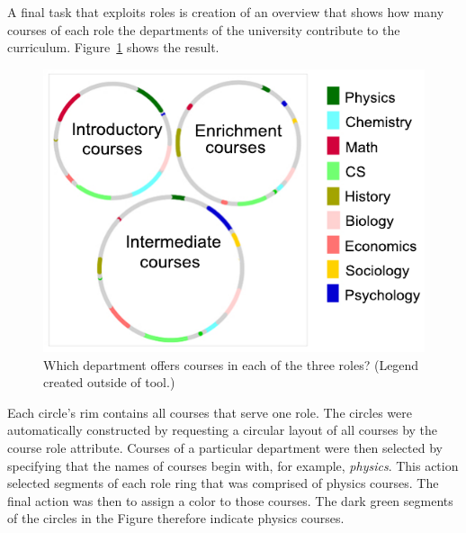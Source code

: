A final task that exploits roles is creation of an overview that shows
how many courses of each role the departments of the university
contribute to the curriculum. Figure~\ref{fig:rolxCircles} shows the
result.
\begin{figure}
    \centering
    \includegraphics{Figs/rolxRingsCroppedLegendOutside.pdf}
    \caption{Which department offers courses in each of the three
      roles? (Legend created outside of tool.)
    }
    \label{fig:rolxCircles}
\end{figure}
Each circle's rim contains all courses that serve one role. The
circles were automatically constructed by requesting a circular layout
of all courses by the course role attribute. Courses of a particular
department were then selected by specifying that the names of courses
begin with, for example, {\em physics}. This action selected segments
of each role ring that was comprised of physics courses. The final
action was then to assign a color to those courses. The dark green
segments of the circles in the Figure therefore indicate physics
courses.

